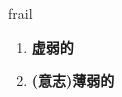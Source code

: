 
\begin{frame}
{\huge frail}
\begin{center}
\begin{enumerate}\Large
  \item \textbf{虚弱的}
  \item \textbf{(意志)薄弱的}
\end{enumerate}
\end{center}
\end{frame}
